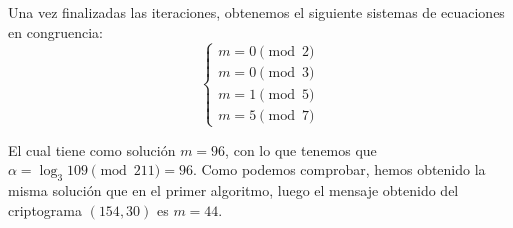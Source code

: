 \documentclass[fleqn]{article}
\begin{document}
    Una vez finalizadas las iteraciones, obtenemos el siguiente sistemas de ecuaciones en congruencia:
    $$\left\{ \begin{aligned}
        m = 0 \pmod{2} \\
        m = 0 \pmod{3} \\
        m = 1 \pmod{5} \\
        m = 5 \pmod{7}
    \end{aligned}\right.
    $$

    El cual tiene como solución $m = 96$, con lo que tenemos que $\alpha = \log_3 109 \pmod{211} = 96$.
    Como podemos comprobar, hemos obtenido la misma solución que en el primer algoritmo, luego el mensaje
    obtenido del criptograma $(154, 30)$ es $m = 44$.
\end{document}
